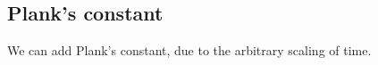 
\subsection{Plank's constant}

We can add Plank's constant, due to the arbitrary scaling of time.

